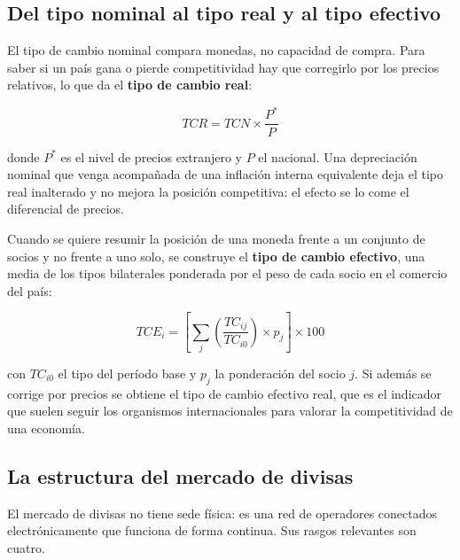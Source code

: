 \subsection{Del tipo nominal al tipo real y al tipo efectivo}

El tipo de cambio nominal compara monedas, no capacidad de compra. Para saber si
un país gana o pierde competitividad hay que corregirlo por los precios
relativos, lo que da el \textbf{tipo de cambio real}:

\[
TCR = TCN \times \frac{P^{*}}{P}
\]

donde $P^{*}$ es el nivel de precios extranjero y $P$ el nacional. Una
depreciación nominal que venga acompañada de una inflación interna equivalente
deja el tipo real inalterado y no mejora la posición competitiva: el efecto se
lo come el diferencial de precios.

Cuando se quiere resumir la posición de una moneda frente a un conjunto de
socios y no frente a uno solo, se construye el \textbf{tipo de cambio efectivo},
una media de los tipos bilaterales ponderada por el peso de cada socio en el
comercio del país:

\[
TCE_i = \left[ \sum_j \left( \frac{TC_{ij}}{TC_{i0}} \right) \times p_j \right]
\times 100
\]

con $TC_{i0}$ el tipo del período base y $p_j$ la ponderación del socio $j$. Si
además se corrige por precios se obtiene el tipo de cambio efectivo real, que es
el indicador que suelen seguir los organismos internacionales para valorar la
competitividad de una economía.

\subsection{La estructura del mercado de divisas}

El mercado de divisas no tiene sede física: es una red de operadores conectados
electrónicamente que funciona de forma continua. Sus rasgos relevantes son
cuatro.

